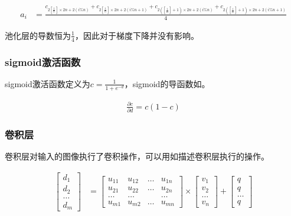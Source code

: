 \begin{equation}\label{eq:pooling-bp}
\begin{aligned}
a_i &= \frac{ 
c_{2 [\frac{i}{n}] \times 2n + 2(i \% n)} +
c_{2 [\frac{i}{n}] \times 2n + 2(i \% n + 1)} + 
c_{2 ([\frac{i}{n}] + 1) \times 2n + 2(i \% n)} + 
c_{2 ([\frac{i}{n}] + 1) \times 2n + 2(i \% n + 1)} }
{4}
\end{aligned}
\end{equation}

池化层的导数恒为$\frac{1}{4}$，因此对于梯度下降并没有影响。

\subsubsection{sigmoid激活函数}

sigmoid激活函数定义为$c=\frac{1}{1+e^{-d}}$，sigmoid的导函数如。

\begin{equation}\label{eq:sigmoid-bp}
\begin{aligned}
\frac{\partial c}{\partial d} = c(1-c)
\end{aligned}
\end{equation}

\subsubsection{卷积层}

卷积层对输入的图像执行了卷积操作，可以用如描述卷积层执行的操作。

\begin{equation}\label{eq:convolution-layer}
\begin{aligned}
\begin{bmatrix}
d_1 \\ d_2 \\ \dots \\ d_m
\end{bmatrix}
&=
\begin{bmatrix}
u_{11} & u_{12} & \dots & u_{1n} \\
u_{21} & u_{22} & \dots & u_{2n} \\
\dots & \dots &   & \dots \\
u_{m1} & u_{m2} & \dots & u_{mn} 
\end{bmatrix}
\times
\begin{bmatrix}
v_1 \\ v_2 \\ \dots \\ v_n
\end{bmatrix}
+
\begin{bmatrix}
q \\ q \\ \dots \\ q
\end{bmatrix}
\end{aligned}
\end{equation}

